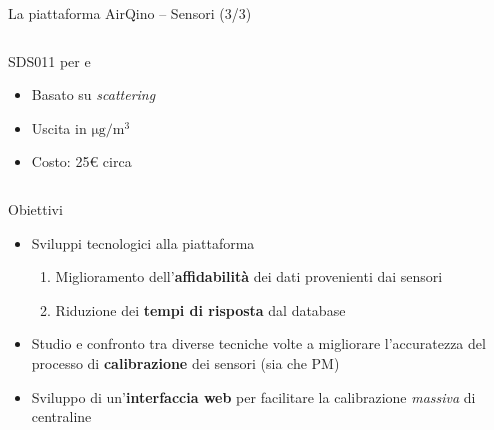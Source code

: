 \begin{frame}[t]{La piattaforma AirQino – Sensori (3/3)}
\begin{columns}
\begin{column}{0.5\textwidth}
\begin{center}
\begin{block}{SDS011 per  e }
\begin{figure}[H]
    \centering
\end{figure}
\vspace{0.1cm}
\begin{itemize}
  \item Basato su \textit{scattering}
  \item Uscita in $\mathrm{\si{\micro}g/m^3}$
  \item Costo: 25€ circa
\end{itemize}
\vspace{0.1cm}

\end{block}
\end{center}
\end{column}

\end{columns}
\end{frame}

\begin{frame}{Obiettivi}
\begin{itemize}
  \item Sviluppi tecnologici alla piattaforma
  \begin{enumerate}
    \item Miglioramento dell'\textbf{affidabilità} dei dati provenienti dai sensori
    \item Riduzione dei \textbf{tempi di risposta} dal database
  \end{enumerate}\vspace{0.3cm}
  \item Studio e confronto tra diverse tecniche volte a migliorare l’accuratezza del processo di \textbf{calibrazione} dei sensori (sia  che PM)\vspace{0.3cm}
  \item Sviluppo di un’\textbf{interfaccia web} per facilitare la calibrazione \textit{massiva} di centraline
\end{itemize}
\end{frame}


